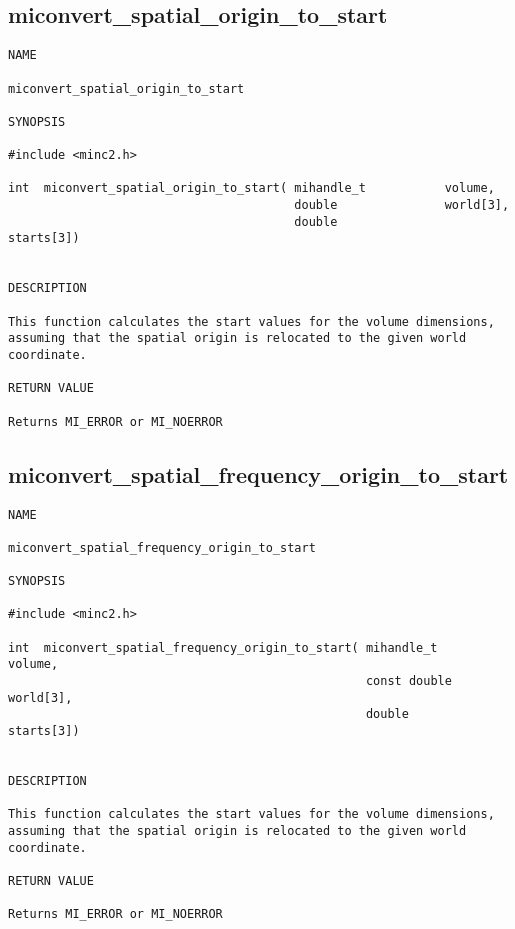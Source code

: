 \documentclass{article}
\begin{document}
\subsection{miconvert\_spatial\_origin\_to\_start}
\begin{verbatim}
NAME 

miconvert_spatial_origin_to_start

SYNOPSIS

#include <minc2.h>

int  miconvert_spatial_origin_to_start( mihandle_t           volume,
                                        double               world[3],
                                        double               starts[3])
                       
                                
DESCRIPTION

This function calculates the start values for the volume dimensions,
assuming that the spatial origin is relocated to the given world
coordinate.

RETURN VALUE

Returns MI_ERROR or MI_NOERROR

\end{verbatim}

\subsection{miconvert\_spatial\_frequency\_origin\_to\_start}
\begin{verbatim}
NAME 

miconvert_spatial_frequency_origin_to_start

SYNOPSIS

#include <minc2.h>

int  miconvert_spatial_frequency_origin_to_start( mihandle_t         volume,
                                                  const double       world[3],
                                                  double             starts[3])
                       
                                
DESCRIPTION

This function calculates the start values for the volume dimensions,
assuming that the spatial origin is relocated to the given world
coordinate.

RETURN VALUE

Returns MI_ERROR or MI_NOERROR

\end{verbatim}
\end{document}
